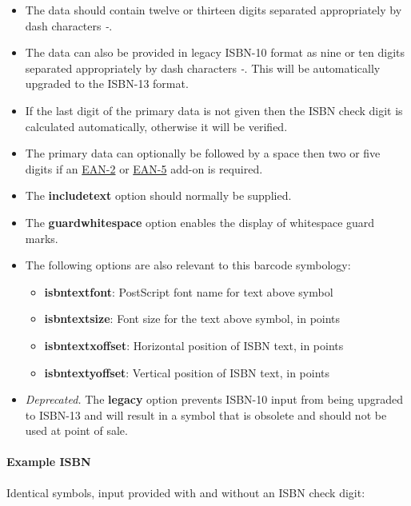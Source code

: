 \begin{itemize}
\tightlist
\item
  The data should contain twelve or thirteen digits separated
  appropriately by dash characters \emph{-}.
\item
  The data can also be provided in legacy ISBN-10 format as nine or ten
  digits separated appropriately by dash characters \emph{-}. This will
  be automatically upgraded to the ISBN-13 format.
\item
  If the last digit of the primary data is not given then the ISBN check
  digit is calculated automatically, otherwise it will be verified.
\item
  The primary data can optionally be followed by a space then two or
  five digits if an \protect\hyperlink{ean-2}{EAN-2} or
  \protect\hyperlink{ean-5}{EAN-5} add-on is required.
\item
  The \textbf{includetext} option should normally be supplied.
\item
  The \textbf{guardwhitespace} option enables the display of whitespace
  guard marks.
\item
  The following options are also relevant to this barcode symbology:

  \begin{itemize}
  \tightlist
  \item
    \textbf{isbntextfont}: PostScript font name for text above symbol
  \item
    \textbf{isbntextsize}: Font size for the text above symbol, in
    points
  \item
    \textbf{isbntextxoffset}: Horizontal position of ISBN text, in
    points
  \item
    \textbf{isbntextyoffset}: Vertical position of ISBN text, in points
  \end{itemize}
\item
  \emph{Deprecated.} The \textbf{legacy} option prevents ISBN-10 input
  from being upgraded to ISBN-13 and will result in a symbol that is
  obsolete and should not be used at point of sale.
\end{itemize}

\hypertarget{example-isbn}{%
\paragraph{Example ISBN}\label{example-isbn}}

Identical symbols, input provided with and without an ISBN check digit:

